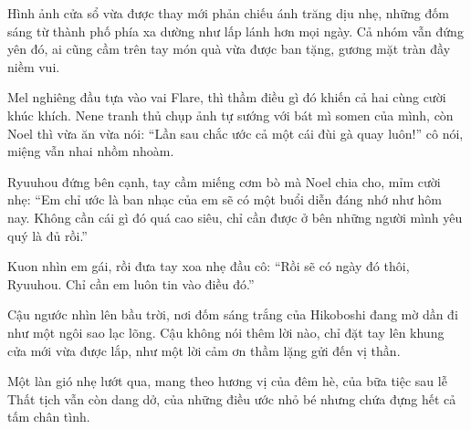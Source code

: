 \documentclass[../main.tex]{subfiles}
\begin{document}
Hình ảnh cửa sổ vừa được thay mới phản chiếu ánh trăng dịu nhẹ, những đốm sáng từ thành phố phía xa dường như lấp lánh hơn mọi ngày. Cả nhóm vẫn đứng yên đó, ai cũng cầm trên tay món quà vừa được ban tặng, gương mặt tràn đầy niềm vui.

Mel nghiêng đầu tựa vào vai Flare, thì thầm điều gì đó khiến cả hai cùng cười khúc khích. Nene tranh thủ chụp ảnh tự sướng với bát mì somen của mình, còn Noel thì vừa ăn vừa nói: ``Lần sau chắc ước cả một cái đùi gà quay luôn!'' cô nói, miệng vẫn nhai nhồm nhoàm.

Ryuuhou đứng bên cạnh, tay cầm miếng cơm bò mà Noel chia cho, mỉm cười nhẹ: ``Em chỉ ước là ban nhạc của em sẽ có một buổi diễn đáng nhớ như hôm nay. Không cần cái gì đó quá cao siêu, chỉ cần được ở bên những người mình yêu quý là đủ rồi.''

Kuon nhìn em gái, rồi đưa tay xoa nhẹ đầu cô: ``Rồi sẽ có ngày đó thôi, Ryuuhou. Chỉ cần em luôn tin vào điều đó.''

Cậu ngước nhìn lên bầu trời, nơi đốm sáng trắng của Hikoboshi đang mờ dần đi như một ngôi sao lạc lõng. Cậu không nói thêm lời nào, chỉ đặt tay lên khung cửa mới vừa được lắp, như một lời cảm ơn thầm lặng gửi đến vị thần.

Một làn gió nhẹ lướt qua, mang theo hương vị của đêm hè, của bữa tiệc sau lễ Thất tịch vẫn còn dang dở, của những điều ước nhỏ bé nhưng chứa đựng hết cả tấm chân tình.
\end{document}
